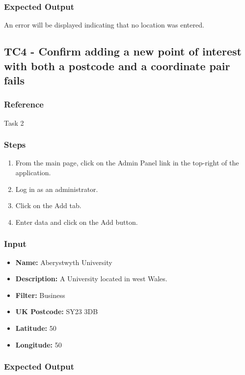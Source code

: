\subsubsection{Expected Output}

An error will be displayed indicating that no location was entered.

\subsection{TC4 - Confirm adding a new point of interest with both a postcode and a coordinate pair fails}

\subsubsection{Reference}

Task 2

\subsubsection{Steps}

\begin{enumerate}
	\item From the main page, click on the Admin Panel link in the top-right of the application.
	\item Log in as an administrator.
	\item Click on the Add tab.
	\item Enter data and click on the Add button.
\end{enumerate}	

\subsubsection{Input}

\begin{itemize}
	\item \textbf{Name: } Aberystwyth University
	\item \textbf{Description: } A University located in west Wales.
	\item \textbf{Filter: } Business
	\item \textbf{UK Postcode: } SY23 3DB
	\item \textbf{Latitude: } 50
	\item \textbf{Longitude: } 50
\end{itemize}	
\subsubsection{Expected Output}

